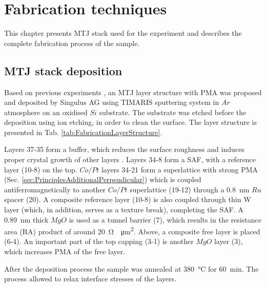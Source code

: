\chapter{Fabrication techniques}
\label{sec:Fabrication}

This chapter presents MTJ stack used for the experiment and describes the complete fabrication process of the sample.

\section{MTJ stack deposition} \label{sec:FabricationStack}

    Based on previous experiments \cite{skowronski2017understanding}, an MTJ layer structure with PMA was proposed and deposited by Singulus AG using TIMARIS sputtering system in $Ar$ atmosphere on an oxidised $Si$ substrate. The substrate was etched before the deposition using ion etching, in order to clean the surface. The layer structure is presented in Tab. \ref{tab:FabricationLayerStructure}. 
    
    Layers 37-35 form a buffer, which reduces the surface roughness and induces proper crystal growth of other layers \cite{banasik2015magnetic}. Layers 34-8 form a SAF, with a reference layer (10-8) on the top. $Co/Pt$ layers 34-21 form a superlattice with strong PMA (Sec. \ref{sec:PrinciplesAdditionalPerpendicular}) which is coupled antiferromagnetically to another $Co/Pt$ superlattice (19-12) through a \SI{0.8}{\nano\meter} $Ru$ spacer (20). A composite reference layer (10-8) is also coupled through thin W layer (which, in addition, serves as a texture break), completing the SAF. A \SI{0.89}{\nano\meter} thick $MgO$ is used as a tunnel barrier (7), which results in the resistance area (RA) product of around \SI{20}{\ohm\times\micro\metre\squared}. Above, a composite free layer is placed (6-4). An important part of the top capping (3-1) is another $MgO$ layer (3), which increases PMA of the free layer.
    
    After the deposition process the sample was annealed at \SI{380}{\celsius} for \SI{60}{\minute}. The process allowed to relax interface stresses of the layers.
    
